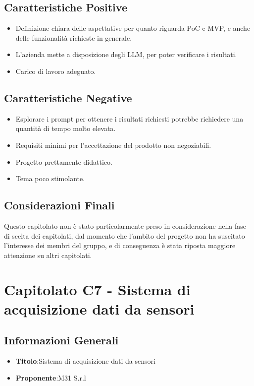 \documentclass[a4paper,12pt]{article}
\begin{document}
    \subsection{Caratteristiche Positive}
    \begin{itemize}
		\item Definizione chiara delle aspettative per quanto riguarda PoC e MVP, e anche delle funzionalità richieste in generale.
		\item L’azienda mette a disposizione degli LLM, per poter verificare i risultati.
		\item Carico di lavoro adeguato.
    \end{itemize}
    \subsection{Caratteristiche Negative}
    \begin{itemize}
		\item Esplorare i prompt per ottenere i risultati richiesti potrebbe richiedere una quantità di tempo molto elevata.
		\item Requisiti minimi per l’accettazione del prodotto non negoziabili.
		\item Progetto prettamente didattico.
		\item Tema poco stimolante.
    \end{itemize}
    \subsection{Considerazioni Finali}
    Questo capitolato non è stato particolarmente preso in considerazione nella fase di scelta dei capitolati, dal momento che l’ambito del progetto non ha suscitato l’interesse dei membri del gruppo, e di conseguenza è stata riposta maggiore attenzione su altri capitolati.

    \section{Capitolato C7 - Sistema di acquisizione dati da sensori}
    \subsection{Informazioni Generali}
        \begin{itemize}
            \item \textbf{Titolo}:Sistema di acquisizione dati da sensori
            \item \textbf{Proponente}:M31 S.r.l
        \end{itemize}
\end{document}
